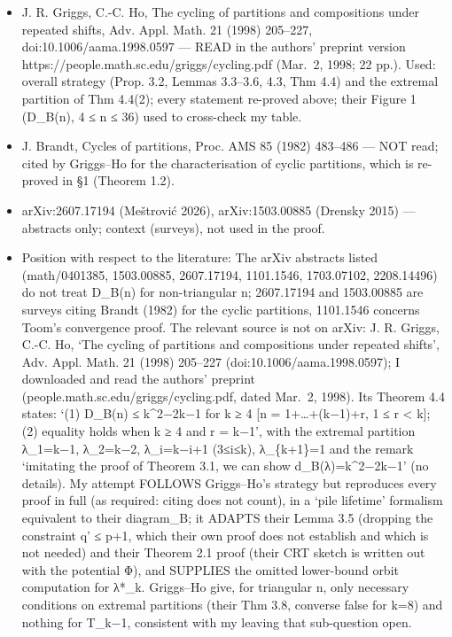 \documentclass[11pt,a4paper]{article}
\providecommand{\tightlist}{\setlength{\itemsep}{0pt}\setlength{\parskip}{0pt}}
\begin{document}
\begin{itemize}
\tightlist
\item
  J. R. Griggs, C.-C. Ho, The cycling of partitions and compositions
  under repeated shifts, Adv. Appl. Math. 21 (1998) 205--227,
  doi:10.1006/aama.1998.0597 --- READ in the authors' preprint version
  https://people.math.sc.edu/griggs/cycling.pdf (Mar.~2, 1998; 22 pp.).
  Used: overall strategy (Prop. 3.2, Lemmas 3.3--3.6, 4.3, Thm 4.4) and
  the extremal partition of Thm 4.4(2); every statement re-proved above;
  their Figure 1 (D\_B(n), 4 ≤ n ≤ 36) used to cross-check my table.
\item
  J. Brandt, Cycles of partitions, Proc. AMS 85 (1982) 483--486 --- NOT
  read; cited by Griggs--Ho for the characterisation of cyclic
  partitions, which is re-proved in §1 (Theorem 1.2).
\item
  arXiv:2607.17194 (Meštrović 2026), arXiv:1503.00885 (Drensky 2015) ---
  abstracts only; context (surveys), not used in the proof.
\item
  Position with respect to the literature: The arXiv abstracts listed
  (math/0401385, 1503.00885, 2607.17194, 1101.1546, 1703.07102,
  2208.14496) do not treat D\_B(n) for non-triangular n; 2607.17194 and
  1503.00885 are surveys citing Brandt (1982) for the cyclic partitions,
  1101.1546 concerns Toom's convergence proof. The relevant source is
  not on arXiv: J. R. Griggs, C.-C. Ho, `The cycling of partitions and
  compositions under repeated shifts', Adv. Appl. Math. 21 (1998)
  205--227 (doi:10.1006/aama.1998.0597); I downloaded and read the
  authors' preprint (people.math.sc.edu/griggs/cycling.pdf, dated
  Mar.~2, 1998). Its Theorem 4.4 states: `(1) D\_B(n) ≤ k\^{}2−2k−1 for
  k ≥ 4 {[}n = 1+\ldots+(k−1)+r, 1 ≤ r \textless{} k{]}; (2) equality
  holds when k ≥ 4 and r = k−1', with the extremal partition λ\_1=k−1,
  λ\_2=k−2, λ\_i=k−i+1 (3≤i≤k), λ\_\{k+1\}=1 and the remark `imitating
  the proof of Theorem 3.1, we can show d\_B(λ)=k\^{}2−2k−1' (no
  details). My attempt FOLLOWS Griggs--Ho's strategy but reproduces
  every proof in full (as required: citing does not count), in a `pile
  lifetime' formalism equivalent to their diagram\_B; it ADAPTS their
  Lemma 3.5 (dropping the constraint q' ≤ p+1, which their own proof
  does not establish and which is not needed) and their Theorem 2.1
  proof (their CRT sketch is written out with the potential Φ), and
  SUPPLIES the omitted lower-bound orbit computation for λ*\_k.
  Griggs--Ho give, for triangular n, only necessary conditions on
  extremal partitions (their Thm 3.8, converse false for k=8) and
  nothing for T\_k−1, consistent with my leaving that sub-question open.
\end{itemize}
\end{document}

